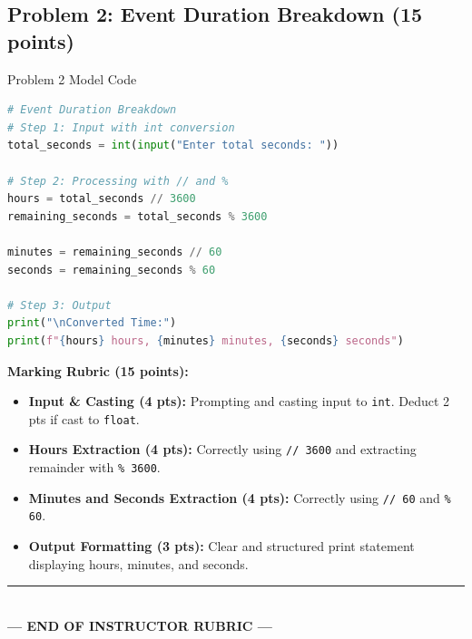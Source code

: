 \documentclass[11pt,a4paper]{article}
\begin{document}
\subsection*{Problem 2: Event Duration Breakdown (15 points)}
\begin{solbox}{Problem 2 Model Code}
\begin{lstlisting}[language=Python]
# Event Duration Breakdown
# Step 1: Input with int conversion
total_seconds = int(input("Enter total seconds: "))

# Step 2: Processing with // and %
hours = total_seconds // 3600
remaining_seconds = total_seconds % 3600

minutes = remaining_seconds // 60
seconds = remaining_seconds % 60

# Step 3: Output
print("\nConverted Time:")
print(f"{hours} hours, {minutes} minutes, {seconds} seconds")
\end{lstlisting}
\textbf{Marking Rubric (15 points):}
\begin{itemize}[noitemsep]
  \item \textbf{Input \& Casting (4 pts):} Prompting and casting input to \texttt{int}. Deduct 2 pts if cast to \texttt{float}.
  \item \textbf{Hours Extraction (4 pts):} Correctly using \texttt{// 3600} and extracting remainder with \texttt{\% 3600}.
  \item \textbf{Minutes and Seconds Extraction (4 pts):} Correctly using \texttt{// 60} and \texttt{\% 60}.
  \item \textbf{Output Formatting (3 pts):} Clear and structured print statement displaying hours, minutes, and seconds.
\end{itemize}
\end{solbox}

\begin{center}
  \vspace{0.4cm}
  \rule{0.5\textwidth}{0.4pt}\\[0.15cm]
  \textbf{\color{correctgreen}--- END OF INSTRUCTOR RUBRIC ---}
\end{center}
\end{document}
